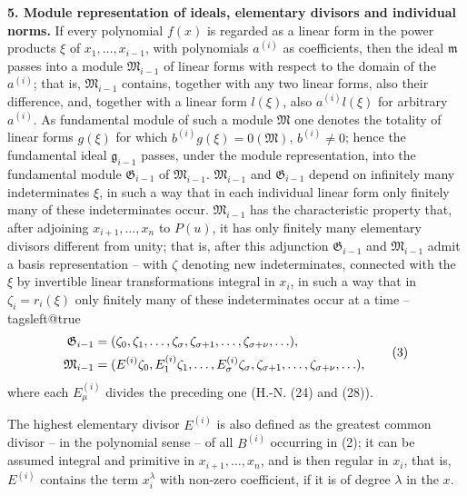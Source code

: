 \documentclass[11pt]{article}
\providecommand{\frakM}{\mathfrak M}
\providecommand{\frakG}{\mathfrak G}
\providecommand{\frakm}{\mathfrak m}
\providecommand{\frakg}{\mathfrak g}
\providecommand{\frakM}{\mathfrak M}
\providecommand{\frakG}{\mathfrak G}
\providecommand{\frakG}{\mathfrak G}
\begin{document}
\textbf{5. Module representation of ideals, elementary divisors and individual norms.} If every polynomial $f(x)$ is regarded as a linear form in the power products $\xi$ of $x_1,\ldots,x_{i-1}$, with polynomials $a^{(i)}$ as coefficients, then the ideal $\frakm$ passes into a module $\frakM_{i-1}$ of linear forms with respect to the domain of the $a^{(i)}$; that is, $\frakM_{i-1}$ contains, together with any two linear forms, also their difference, and, together with a linear form $l(\xi)$, also $a^{(i)}l(\xi)$ for arbitrary $a^{(i)}$. As fundamental module of such a module $\frakM$ one denotes the totality of linear forms $g(\xi)$ for which $b^{(i)}g(\xi)=0(\frakM)$, $b^{(i)}\ne0$; hence the fundamental ideal $\frakg_{i-1}$ passes, under the module representation, into the fundamental module $\frakG_{i-1}$ of $\frakM_{i-1}$. $\frakM_{i-1}$ and $\frakG_{i-1}$ depend on infinitely many indeterminates $\xi$, in such a way that in each individual linear form only finitely many of these indeterminates occur. $\frakM_{i-1}$ has the characteristic property that, after adjoining $x_{i+1},\ldots,x_n$ to $P(u)$, it has only finitely many elementary divisors different from unity; that is, after this adjunction $\frakG_{i-1}$ and $\frakM_{i-1}$ admit a basis representation -- with $\zeta$ denoting new indeterminates, connected with the $\xi$ by invertible linear transformations integral in $x_i$, in such a way that in $\zeta_i=r_i(\xi)$ only finitely many of these indeterminates occur at a time --
{\csname tagsleft@true\endcsname\begin{align}
\frakG_{i-1}&=(\zeta_0,\zeta_1,\ldots,\zeta_\sigma,\zeta_{\sigma+1},\ldots,\zeta_{\sigma+\nu},\ldots), \notag\\
\frakM_{i-1}&=(E^{(i)}\zeta_0,E_1^{(i)}\zeta_1,\ldots,E_\sigma^{(i)}\zeta_\sigma,
\zeta_{\sigma+1},\ldots,\zeta_{\sigma+\nu},\ldots), \tag*{\raisebox{9.5pt}[0pt][0pt]{(3)}}
\end{align}}
where each $E_\mu^{(i)}$ divides the preceding one (H.-N. (24) and (28)).

The highest elementary divisor $E^{(i)}$ is also defined as the greatest common divisor -- in the polynomial sense -- of all $B^{(i)}$ occurring in (2); it can be assumed integral and primitive in $x_{i+1},\ldots,x_n$, and is then regular in $x_i$, that is, $E^{(i)}$ contains the term $x_i^\lambda$ with non-zero coefficient, if it is of degree $\lambda$ in the $x$.
\end{document}
